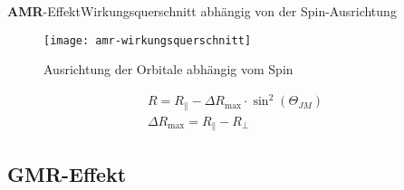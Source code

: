 \begin{frame}{\textbf{A}\textbf{M}\textbf{R}-Effekt}{Wirkungsquerschnitt abhängig von der Spin-Ausrichtung}
	\begin{figure}[H]
		\begin{center}
			\texttt{[image: amr-wirkungsquerschnitt]}
			\caption{Ausrichtung der Orbitale abhängig vom Spin}
		\end{center}
	\end{figure}
	\begin{align*}
    	R = R_\parallel - \Delta R_\mathrm{max} \cdot \sin^2(\Theta_{JM}) \\
    	\Delta R_\mathrm{max} = R_\parallel - R_\perp
    \end{align*}
\end{frame}


\subsection{GMR-Effekt}
